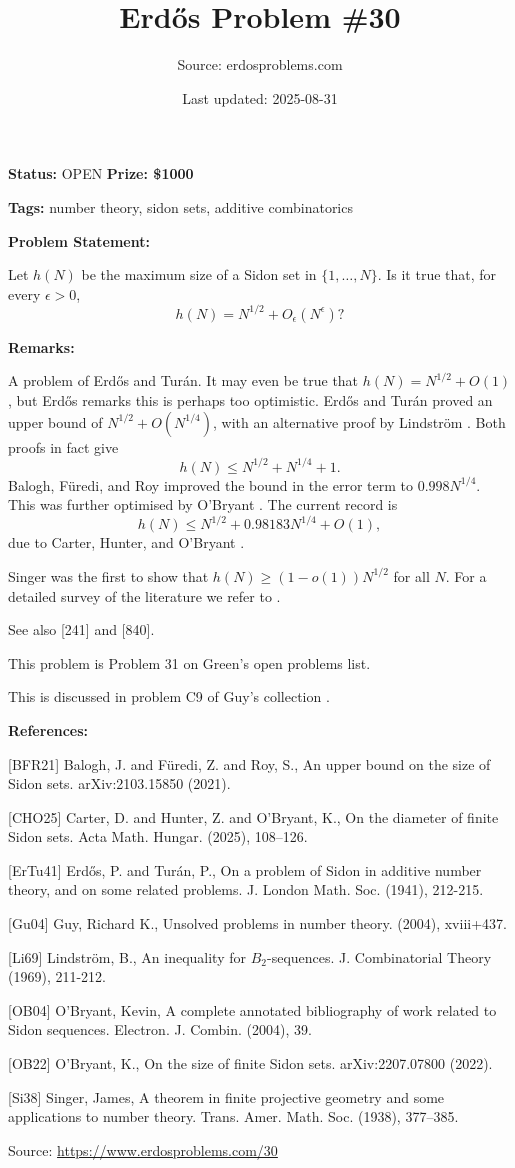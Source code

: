 \documentclass{article}
\title{Erd\H{o}s Problem \#30}
\date{Last updated: 2025-08-31}
\author{Source: erdosproblems.com}
\begin{document}
\maketitle

\noindent\textbf{Status:} OPEN \quad \textbf{Prize: \$1000}

\noindent\textbf{Tags:} number theory, sidon sets, additive combinatorics

\medskip
\noindent\textbf{Problem Statement:}

Let $h(N)$ be the maximum size of a Sidon set in $\{1,\ldots,N\}$. Is it true that, for every $\epsilon>0$,\[h(N) = N^{1/2}+O_\epsilon(N^\epsilon)?\]

\bigskip
\noindent\textbf{Remarks:}

A problem of Erd\H{o}s and Tur\'{a}n. It may even be true that $h(N)=N^{1/2}+O(1)$, but Erd\H{o}s remarks this is perhaps too optimistic. Erd\H{o}s and Tur\'{a}n \cite{ErTu41} proved an upper bound of $N^{1/2}+O(N^{1/4})$, with an alternative proof by Lindstr\"{o}m \cite{Li69}. Both proofs in fact give\[h(N) \leq N^{1/2}+N^{1/4}+1.\]Balogh, F\"{u}redi, and Roy \cite{BFR21} improved the bound in the error term to $0.998N^{1/4}$. This was further optimised by O'Bryant \cite{OB22}. The current record is\[h(N)\leq N^{1/2}+0.98183N^{1/4}+O(1),\]due to Carter, Hunter, and O'Bryant \cite{CHO25}.

Singer \cite{Si38} was the first to show that $h(N)\geq (1-o(1))N^{1/2}$ for all $N$. For a detailed survey of the literature we refer to \cite{OB04}.

See also [241] and [840].

This problem is Problem 31 on Green's open problems list.

This is discussed in problem C9 of Guy's collection \cite{Gu04}.

\bigskip
\noindent\textbf{References:}

[BFR21] Balogh, J. and F\"{u}redi, Z. and Roy, S., An upper bound on the size of Sidon sets. arXiv:2103.15850 (2021).
 
 [CHO25] Carter, D. and Hunter, Z. and O'Bryant, K., On the diameter of finite Sidon sets. Acta Math. Hungar. (2025), 108--126.
 
 [ErTu41] Erd\H{o}s, P. and Tur\'{a}n, P., On a problem of Sidon in additive number theory, and on some related problems. J. London Math. Soc. (1941), 212-215.
 
 [Gu04] Guy, Richard K., Unsolved problems in number theory. (2004), xviii+437.
 
 [Li69] Lindstr\"{o}m, B., An inequality for $B_2$-sequences. J. Combinatorial Theory (1969), 211-212.
 
 [OB04] O'Bryant, Kevin, A complete annotated bibliography of work related to Sidon
sequences. Electron. J. Combin. (2004), 39.
 
 [OB22] O'Bryant, K., On the size of finite Sidon sets. arXiv:2207.07800 (2022).
 
 [Si38] Singer, James, A theorem in finite projective geometry and some applications
to number theory. Trans. Amer. Math. Soc. (1938), 377--385.

\bigskip
\noindent\small{Source: \url{https://www.erdosproblems.com/30}}
\end{document}

